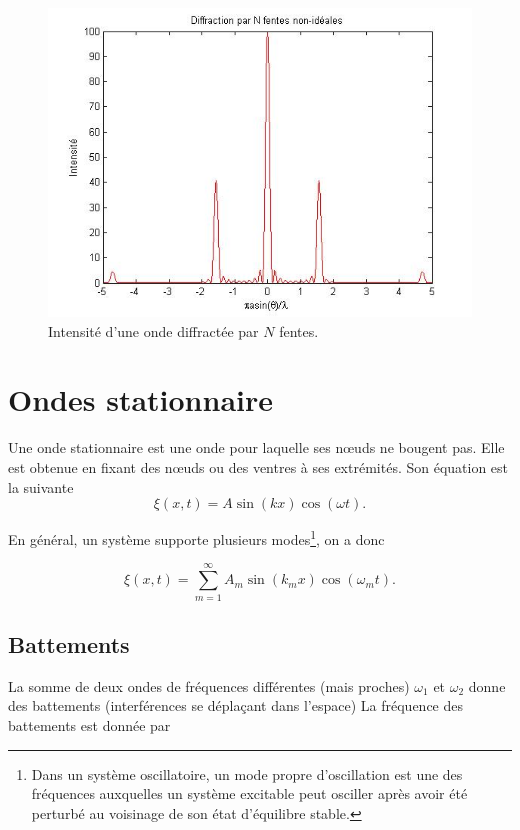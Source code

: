 \begin{figure}[ht!]
	\centering
	\includegraphics[scale=0.6]{diffraction3.jpg}
	\caption{Intensité d'une onde diffractée par $N$ fentes.}
	\label{fig:diffractionN}
\end{figure}


\section{Ondes stationnaire}
Une onde stationnaire est une onde pour laquelle ses nœuds ne bougent pas.
Elle est obtenue en fixant des nœuds ou des ventres à ses extrémités.
Son équation est la suivante
\[ \xi(x, t) = A \sin(kx) \cos(\omega t). \]

En général, un système supporte plusieurs modes\footnote{Dans un système 
oscillatoire, un mode propre d'oscillation est une des fréquences auxquelles
un système excitable peut osciller après avoir été perturbé au voisinage
de son état d'équilibre stable.}, on a donc

$$\xi(x, t) = \sum_{m=1}^{\infty} A_m \sin(k_mx) \cos(\omega_m t).$$


\subsection{Battements}
La somme de deux ondes de fréquences différentes (mais proches)
$\omega_1$ et $\omega_2$ donne des battements (interférences se
déplaçant dans l'espace) La fréquence des battements
est donnée par


